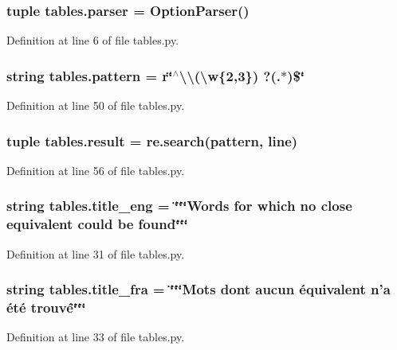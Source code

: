 \hypertarget{namespacetables_aab6cde738d50479c3c5e30496abe9b1f}{
\subsubsection[{parser}]{\setlength{\rightskip}{0pt plus 5cm}tuple tables.\+parser = Option\+Parser()}}\label{namespacetables_aab6cde738d50479c3c5e30496abe9b1f}


Definition at line 6 of file tables.\+py.

\hypertarget{namespacetables_a8bbd43050092a96f2ed859cd38010ac9}{
\subsubsection[{pattern}]{\setlength{\rightskip}{0pt plus 5cm}string tables.\+pattern = r\char`\"{}$^\wedge$\textbackslash{}\textbackslash{}(\textbackslash{}w\{2,3\}) ?(.$\ast$)\$\char`\"{}}}\label{namespacetables_a8bbd43050092a96f2ed859cd38010ac9}


Definition at line 50 of file tables.\+py.

\hypertarget{namespacetables_a275d1c279456ee271849bbe69bf7cc33}{
\subsubsection[{result}]{\setlength{\rightskip}{0pt plus 5cm}tuple tables.\+result = re.\+search({\bf pattern}, line)}}\label{namespacetables_a275d1c279456ee271849bbe69bf7cc33}


Definition at line 56 of file tables.\+py.

\hypertarget{namespacetables_ad441c656fe4d99ca32f027870b0eb314}{
\subsubsection[{title\+\_\+eng}]{\setlength{\rightskip}{0pt plus 5cm}string tables.\+title\+\_\+eng = \char`\"{}\char`\"{}\char`\"{}Words for which no close equivalent could be found\char`\"{}\char`\"{}\char`\"{}}}\label{namespacetables_ad441c656fe4d99ca32f027870b0eb314}


Definition at line 31 of file tables.\+py.

\hypertarget{namespacetables_a0aadda1a5ce9f5d273022f631a8a28da}{
\subsubsection[{title\+\_\+fra}]{\setlength{\rightskip}{0pt plus 5cm}string tables.\+title\+\_\+fra = \char`\"{}\char`\"{}\char`\"{}Mots dont aucun équivalent n'a été trouvé\char`\"{}\char`\"{}\char`\"{}}}\label{namespacetables_a0aadda1a5ce9f5d273022f631a8a28da}


Definition at line 33 of file tables.\+py.

